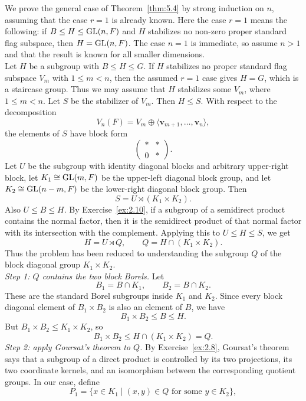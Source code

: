 \documentclass[../Odyssey_Project.tex]{subfiles}
\begin{document}
\begin{solution}
We prove the general case of Theorem~\ref{thm:5.4} by strong induction on $n$, assuming that the case $r=1$ is already known. Here the case $r=1$ means the following: if $B\leq H\leq \operatorname{GL}(n,F)$ and $H$ stabilizes no non-zero proper standard flag subspace, then $H=\operatorname{GL}(n,F)$. The case $n=1$ is immediate, so assume $n>1$ and that the result is known for all smaller dimensions.\\
Let $H$ be a subgroup with $B\leq H\leq G$. If $H$ stabilizes no proper standard flag subspace $V_m$ with $1\leq m<n$, then the assumed $r=1$ case gives $H=G$, which is a staircase group. Thus we may assume that $H$ stabilizes some $V_m$, where $1\leq m<n$. Let $S$ be the stabilizer of $V_m$. Then $H\leq S$. With respect to the decomposition
\[
    V_n(F)=V_m\oplus \langle \mathbf{v}_{m+1},\dots,\mathbf{v}_n\rangle,
\]
the elements of $S$ have block form
\[
    \begin{pmatrix}
        * & *\\
        0 & *
    \end{pmatrix}.
\]
Let $U$ be the subgroup with identity diagonal blocks and arbitrary upper-right block, let $K_1\cong \operatorname{GL}(m,F)$ be the upper-left diagonal block group, and let $K_2\cong \operatorname{GL}(n-m,F)$ be the lower-right diagonal block group. Then
\[
    S=U\rtimes (K_1\times K_2).
\]
Also $U\leq B\leq H$. By Exercise~\ref{ex:2.10}, if a subgroup of a semidirect product contains the normal factor, then it is the semidirect product of that normal factor with its intersection with the complement. Applying this to $U\leq H\leq S$, we get
\[
    H=U\rtimes Q,
    \qquad
    Q=H\cap (K_1\times K_2).
\]
Thus the problem has been reduced to understanding the subgroup $Q$ of the block diagonal group $K_1\times K_2$.\\
\textit{Step 1: $Q$ contains the two block Borels.} Let
\[
    B_1=B\cap K_1,
    \qquad
    B_2=B\cap K_2.
\]
These are the standard Borel subgroups inside $K_1$ and $K_2$. Since every block diagonal element of $B_1\times B_2$ is also an element of $B$, we have
\[
    B_1\times B_2\leq B\leq H.
\]
But $B_1\times B_2\leq K_1\times K_2$, so
\[
    B_1\times B_2\leq H\cap (K_1\times K_2)=Q.
\]
\textit{Step 2: apply Goursat's theorem to $Q$.} By Exercise~\ref{ex:2.8}, Goursat's theorem says that a subgroup of a direct product is controlled by its two projections, its two coordinate kernels, and an isomorphism between the corresponding quotient groups. In our case, define
\[
    P_1=\{x\in K_1\mid (x,y)\in Q \text{ for some } y\in K_2\},
\]
\end{solution}
\end{document}
